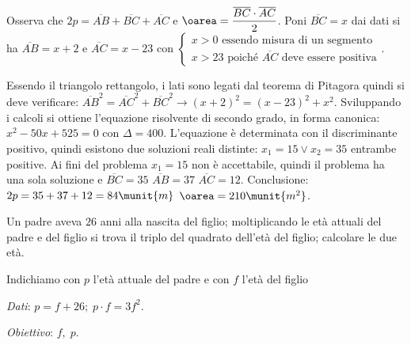 \begin{soluzione}

Osserva che \(2 p = \overline {AB} +\overline {BC} +\overline {AC}\) e 
\(\oarea = \dfrac{\overline {BC} \cdot \overline {AC}}{2}\).
Poni \(\overline {BC} = x\) dai dati si ha \(\overline {AB} = x +2\) e 
\(\overline{AC} = x -23\) con
\(\left\{\begin{array}{l} x > 0 \text{ essendo misura di un segmento} \\
x >23 \text{ poiché } \overline {AC} \text{ deve essere positiva}
\end{array}\right.\).

Essendo il triangolo rettangolo, i lati sono legati dal teorema di Pitagora
quindi si deve verificare: 
\(\overline {AB}^{2}= \overline {AC}^{2} +\overline 
{BC}^{2}\rightarrow ( x +2 )^{2} = ( x -23 )^{2} +x^2\). 
Sviluppando i calcoli si ottiene l'equazione risolvente di secondo grado, 
in forma canonica: 
\(x^2 -50 x +525 = 0 \text{ con } \Delta = 400\). 
L'equazione è determinata con il discriminante positivo, quindi esistono 
due soluzioni reali distinte: 
\(x_1 = 15 \vee x_2 = 35\) entrambe positive. 
Ai fini del problema \(x_1 = 15\) non è accettabile, quindi il problema ha 
una sola soluzione e 
\(\overline 
{BC} = 35\) \(\overline {AB} = 37\) \(\overline {AC} = 12\). 
Conclusione: 
\(2 p = 35 +37 +12 = 84\munit{m}\) \(\oarea = 210\munit{m^{2}}\).
\end{soluzione}

\begin{problema}{}{}
Un padre aveva \(26\) anni alla nascita del figlio; moltiplicando le età 
attuali 
del padre e del figlio si trova il triplo del quadrato dell'età del figlio; 
calcolare le due età.
\end{problema}
Indichiamo con \(p\) l'età attuale del padre e con \(f\) l'età del figlio

\emph{Dati}: \(p = f +26;\; p \cdot f = 3 f^{2}\).

\emph{Obiettivo}: \(f,\; p\).

